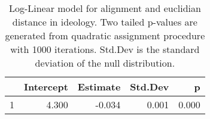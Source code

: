 \begin{table}[ht]
\centering
\begin{tabular}{rrrrr}
  \hline
 & Intercept & Estimate & Std.Dev & p \\ 
  \hline
1 & 4.300 & -0.034 & 0.001 & 0.000 \\ 
   \hline
\end{tabular}
\caption{Log-Linear model for alignment and euclidian
distance in ideology. Two tailed p-values are generated from quadratic
assignment procedure with 1000 iterations. Std.Dev is the standard
deviation of the null distribution.} 
\label{tab:ideology_regs}
\end{table}
